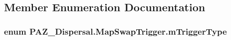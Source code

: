\subsection{Member Enumeration Documentation}
\hypertarget{class_p_a_z___dispersal_1_1_map_swap_trigger_a3767a96c305890046812ada41c4fce00}{
\subsubsection[{m\-Trigger\-Type}]{\setlength{\rightskip}{0pt plus 5cm}enum {\bf P\-A\-Z\-\_\-\-Dispersal.\-Map\-Swap\-Trigger.\-m\-Trigger\-Type}}}\label{class_p_a_z___dispersal_1_1_map_swap_trigger_a3767a96c305890046812ada41c4fce00}
